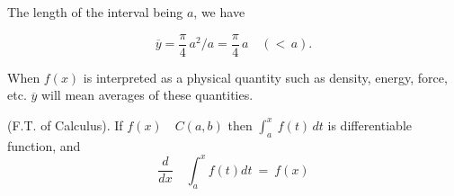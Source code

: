 \documentclass[11pt]{amsbook}
\begin{document}
The length of the interval being $a$, we have

\[ 
\overline{y} 
= \frac{\pi}{4} \, a^2 / a 
= \frac{\pi}{4} \, a \quad (<  \, a).
\]

When $f(x)$ is interpreted as a physical quantity such as density, energy, force, etc. $\overline{y}$ will mean averages of these quantities. 

\begin{thm} (F.T. of Calculus). If $f(x) \quad C(a, b)$ then   $\int_{a}^{x}\ f(t)\, dt$ is differentiable function, and
\[
\frac{d}{dx} \quad 
\int_{a}^{x} f(t) dt 
\: = \: 
f(x)
\]

\end{thm}
\end{document}
